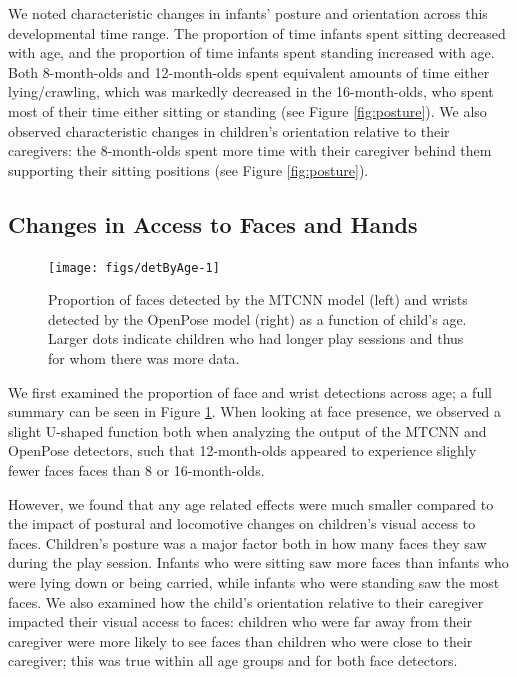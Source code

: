 \documentclass[10pt, letterpaper]{article}
\newenvironment{CodeChunk}{}{}
\begin{document}
We noted characteristic changes in infants' posture and orientation
across this developmental time range. The proportion of time infants
spent sitting decreased with age, and the proportion of time infants
spent standing increased with age. Both 8-month-olds and 12-month-olds
spent equivalent amounts of time either lying/crawling, which was
markedly decreased in the 16-month-olds, who spent most of their time
either sitting or standing (see Figure \ref{fig:posture}). We also
observed characteristic changes in children's orientation relative to
their caregivers: the 8-month-olds spent more time with their caregiver
behind them supporting their sitting positions (see Figure
\ref{fig:posture}).

\subsection{Changes in Access to Faces and
Hands}\label{changes-in-access-to-faces-and-hands}

\begin{CodeChunk}
\begin{figure}[h]

{\centering \texttt{[image: figs/detByAge-1]} 

}

\caption[Proportion of faces detected by the MTCNN model (left) and wrists detected by the OpenPose model (right) as a function of child's age]{Proportion of faces detected by the MTCNN model (left) and wrists detected by the OpenPose model (right) as a function of child's age. Larger dots indicate children who had longer play sessions and thus for whom there was more data.}\label{fig:detByAge}
\end{figure}
\end{CodeChunk}

We first examined the proportion of face and wrist detections across
age; a full summary can be seen in Figure \ref{fig:detByAge}. When
looking at face presence, we observed a slight U-shaped function both
when analyzing the output of the MTCNN and OpenPose detectors, such that
12-month-olds appeared to experience slighly fewer faces faces than 8 or
16-month-olds.

However, we found that any age related effects were much smaller
compared to the impact of postural and locomotive changes on children's
visual access to faces. Children's posture was a major factor both in
how many faces they saw during the play session. Infants who were
sitting saw more faces than infants who were lying down or being
carried, while infants who were standing saw the most faces. We also
examined how the child's orientation relative to their caregiver
impacted their visual access to faces: children who were far away from
their caregiver were more likely to see faces than children who were
close to their caregiver; this was true within all age groups and for
both face detectors.
\end{document}
